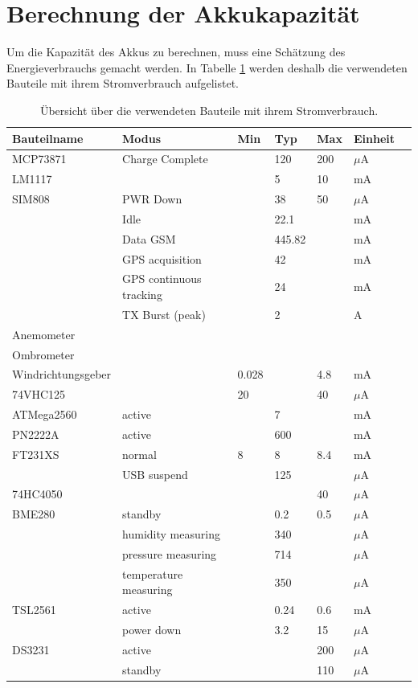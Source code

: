 \section{Berechnung der Akkukapazität}
Um die Kapazität des Akkus zu berechnen, muss eine Schätzung des Energieverbrauchs gemacht werden. In Tabelle \ref{tab:Energieverbrauch} werden deshalb die verwendeten Bauteile mit ihrem Stromverbrauch aufgelistet.
\begin{table}[h]
	\centering
	\caption{Übersicht über die verwendeten Bauteile mit ihrem Stromverbrauch.}
	\small
  \begin{tabular}{lllllll}
  \toprule 
  \textbf{Bauteilname} & \textbf{Modus} & \textbf{Min} & \textbf{Typ} & \textbf{Max} & \textbf{Einheit}\\ 
  \midrule 
  MCP73871 \cite{MCP73871}& Charge Complete &  & 120 & 200 & $\mu$A  \\ 
  \hline 
  LM1117 \cite{LM1117} &  & & 5 & 10 & mA   \\ 
  \hline 
  SIM808 \cite{SIM808}& PWR Down &  & 38 & 50 & $\mu$A   \\ 
   & Idle  &  & 22.1 &  & mA  \\ 
   & Data GSM &  & 445.82 &  & mA   \\ 
   & GPS acquisition &  & 42 &  & mA   \\ 
   & GPS continuous tracking &  & 24 &  & mA   \\ 
   & TX Burst (peak)  &  & 2 &  & A  \\ 
  \hline 
  Anemometer &  &  &  &  &   \\ 
  \hline 
  Ombrometer &  &  &  &  &   \\ 
  \hline 
  Windrichtungsgeber \cite{ADSkeineAngabe}&  & 0.028 &  & 4.8 & mA \\ 
  \hline 
  74VHC125 \cite{74HC125}&  & 20 &  & 40 & $\mu$A  \\ 
  \hline 
  ATMega2560 \cite{arduinoMega}& active &  & 7 &  & mA  \\ 
  \hline
  PN2222A & active &  & 600 &  & mA  \\
  \hline 
  FT231XS \cite{FTDI}& normal & 8 & 8 & 8.4 & mA \\ 
   & USB suspend &  & 125 &  & $\mu$A \\ 
  \hline 
  74HC4050 \cite{74HC4050}&  &  &  & 40 & $\mu$A \\ 
  \hline 
  BME280 \cite{Bosch2019}& standby &  & 0.2 & 0.5 & $\mu$A  \\ 
   & humidity measuring &  & 340 &  & $\mu$A \\ 
   & pressure measuring &  & 714 &  & $\mu$A  \\ 
   & temperature measuring &  & 350 &  & $\mu$A \\ 
  \hline 
  TSL2561 \cite{TSL2561}& active &  & 0.24 & 0.6 & mA \\ 
   & power down &  & 3.2 & 15 & $\mu$A  \\ 
  \hline 
  DS3231 \cite{DS3231DS}& active & &  & 200 & $\mu$A \\ 
   & standby &  & & 110 & $\mu$A  \\ 
  \bottomrule 
  \end{tabular} 
	\label{tab:Energieverbrauch} 
\end{table}
